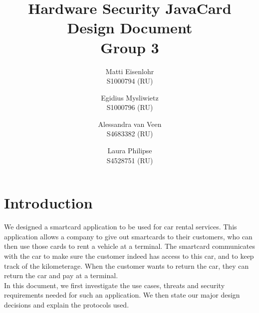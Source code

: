 \documentclass[a4paper]{article}
\title{Hardware Security JavaCard Design Document\\ Group 3}
\author{Matti Eisenlohr\\S1000794 (RU)\and Egidius Mysliwietz\\S1000796 (RU)\and Alessandra van Veen\\S4683382 (RU) \and Laura Philipse\\S4528751 (RU) }
\begin{document}
\maketitle
\tableofcontents
\section{Introduction}
We designed a smartcard application to be used for car rental services. This application allows a company to give out smartcards to their customers, who can then use those cards to rent a vehicle at a terminal. The smartcard communicates with the car to make sure the customer indeed has access to this car, and to keep track of the kilometerage. When the customer wants to return the car, they can return the car and pay at a terminal.\\
In this document, we first investigate the use cases, threats and security requirements needed for such an application. We then state our major design decisions and explain the protocols used.

\end{document}
